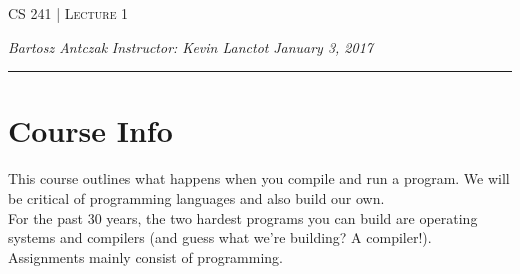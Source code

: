 \documentclass{report}
\newcommand{\lectureNum}{1}
\newcommand{\curDate}{January 3, 2017}
\newcommand{\course}{CS 241}
\newcommand{\instructor}{Kevin Lanctot}
\begin{document}
\begin{center}
\begin{Large}
\textsc{\course{} | Lecture \lectureNum{}}
\end{Large}
\end{center} 
\noindent \textit{Bartosz Antczak} \hfill
\textit{Instructor: \instructor{}} \hfill
\textit{\curDate{}}
\rule{\textwidth}{0.4pt}
\section{Course Info}
This course outlines what happens when you compile and run a program.
We will be critical of programming languages and also build our own.\\
For the past 30 years, the two hardest programs you can build are operating systems and compilers (and guess what we're building? A compiler!). \\
Assignments mainly consist of programming.
\end{document}
